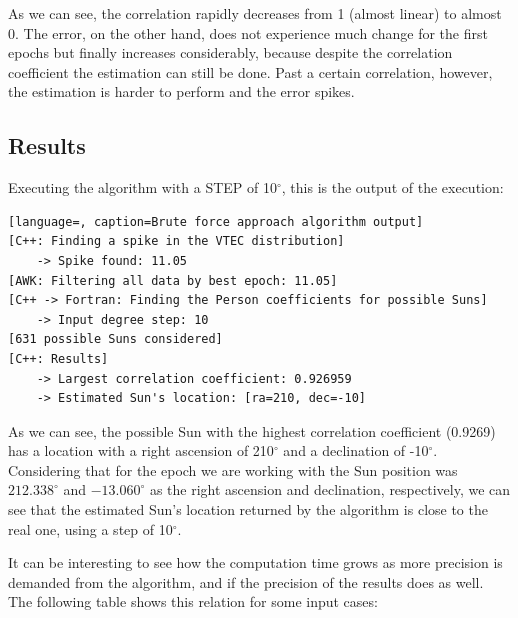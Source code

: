 As we can see, the correlation rapidly decreases from 1 (almost linear) to almost 0. The error, on the other hand, does not experience much change for the first epochs but finally increases considerably, because despite the correlation coefficient the estimation can still be done. Past a certain correlation, however, the estimation is harder to perform and the error spikes. 

\subsection{Results}

Executing the algorithm with a STEP of 10$^{\circ}$, this is the output of the execution:

\begin{minipage}{\linewidth}
\begin{lstlisting}[language=, caption=Brute force approach algorithm output]
[C++: Finding a spike in the VTEC distribution]
	-> Spike found: 11.05
[AWK: Filtering all data by best epoch: 11.05]
[C++ -> Fortran: Finding the Person coefficients for possible Suns]
	-> Input degree step: 10
[631 possible Suns considered]
[C++: Results]
	-> Largest correlation coefficient: 0.926959
	-> Estimated Sun's location: [ra=210, dec=-10]
\end{lstlisting}
\end{minipage}

As we can see, the possible Sun with the highest correlation coefficient (0.9269) has a location with a right ascension of 210$^{\circ}$ and a declination of -10$^{\circ}$. Considering that for the epoch we are working with the Sun position was $212.338^{\circ}$ and $-13.060^{\circ}$ as the right ascension and declination, respectively, we can see that the estimated Sun's location returned by the algorithm is close to the real one, using a step of 10$^{\circ}$.

It can be interesting to see how the computation time grows as more precision is demanded from the algorithm, and if the precision of the results does as well. The following table shows this relation for some input cases:

